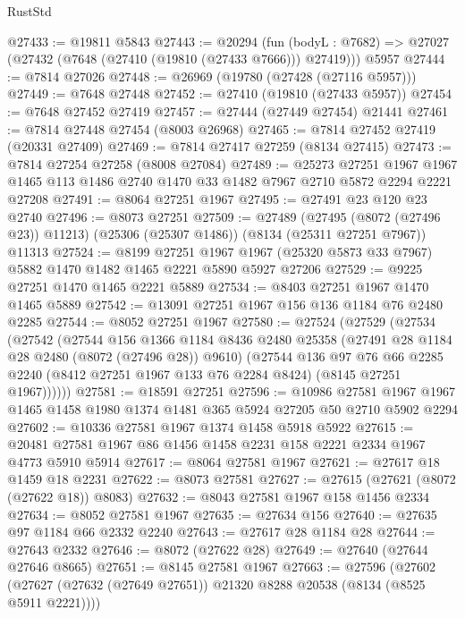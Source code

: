 \begin{lexlean}{RustStd}
\begin{coremodule}
{\begin{coremodule}
{{{{{{{{{{{{{{{{{{{{{{{{{{{{{{{{{{{{{{{{{{{{{{{{{{{{{@27433 := @19811 @5843
@27443 := @20294
    (fun (bodyL : @7682) => @27027 (@27432 (@7648 (@27410 (@19810 (@27433 @7666))) @27419)))
    @5957
@27444 := @7814 @27026
@27448 := @26969 (@19780 (@27428 (@27116 @5957)))
@27449 := @7648 @27448
@27452 := @27410 (@19810 (@27433 @5957))
@27454 := @7648 @27452 @27419
@27457 := @27444 (@27449 @27454) @21441
@27461 := @7814 @27448 @27454 (@8003 @26968)
@27465 := @7814 @27452 @27419 (@20331 @27409)
@27469 := @7814 @27417 @27259 (@8134 @27415)
@27473 := @7814 @27254 @27258 (@8008 @27084)
@27489 := @25273
    @27251
    @1967
    @1967
    @1465
    @113
    @1486
    @2740
    @1470
    @33
    @1482
    @7967
    @2710
    @5872
    @2294
    @2221
    @27208
@27491 := @8064 @27251 @1967
@27495 := @27491 @23 @120 @23 @2740
@27496 := @8073 @27251
@27509 := @27489
    (@27495 (@8072 (@27496 @23)) @11213)
    (@25306 (@25307 @1486))
    (@8134 (@25311 @27251 @7967))
    @11313
@27524 := @8199
    @27251
    @1967
    @1967
    (@25320 @5873 @33 @7967)
    @5882
    @1470
    @1482
    @1465
    @2221
    @5890
    @5927
    @27206
@27529 := @9225 @27251 @1470 @1465 @2221 @5889
@27534 := @8403 @27251 @1967 @1470 @1465 @5889
@27542 := @13091 @27251 @1967 @156 @136 @1184 @76 @2480 @2285
@27544 := @8052 @27251 @1967
@27580 := @27524
    (@27529
      (@27534
        (@27542
          (@27544
            @156
            @1366
            @1184
            @8436
            @2480
            @25358
            (@27491 @28 @1184 @28 @2480 (@8072 (@27496 @28)) @9610)
            (@27544
              @136
              @97
              @76
              @66
              @2285
              @2240
              (@8412 @27251 @1967 @133 @76 @2284 @8424)
              (@8145 @27251 @1967))))))
@27581 := @18591 @27251
@27596 := @10986
    @27581
    @1967
    @1967
    @1465
    @1458
    @1980
    @1374
    @1481
    @365
    @5924
    @27205
    @50
    @2710
    @5902
    @2294
@27602 := @10336 @27581 @1967 @1374 @1458 @5918 @5922
@27615 := @20481 @27581 @1967 @86 @1456 @1458 @2231 @158 @2221 @2334 @1967 @4773 @5910 @5914
@27617 := @8064 @27581 @1967
@27621 := @27617 @18 @1459 @18 @2231
@27622 := @8073 @27581
@27627 := @27615 (@27621 (@8072 (@27622 @18)) @8083)
@27632 := @8043 @27581 @1967 @158 @1456 @2334
@27634 := @8052 @27581 @1967
@27635 := @27634 @156
@27640 := @27635 @97 @1184 @66 @2332 @2240
@27643 := @27617 @28 @1184 @28
@27644 := @27643 @2332
@27646 := @8072 (@27622 @28)
@27649 := @27640 (@27644 @27646 @8665)
@27651 := @8145 @27581 @1967
@27663 := @27596
    (@27602 (@27627 (@27632 (@27649 @27651)) @21320 @8288 @20538 (@8134 (@8525 @5911 @2221))))
}}}}}}}}}}}}}}}}}}}}}}}}}}}}}}}}}}}}}}}}}}}}}}}}}}}}}
\end{coremodule}}
\end{coremodule}
\end{lexlean}
